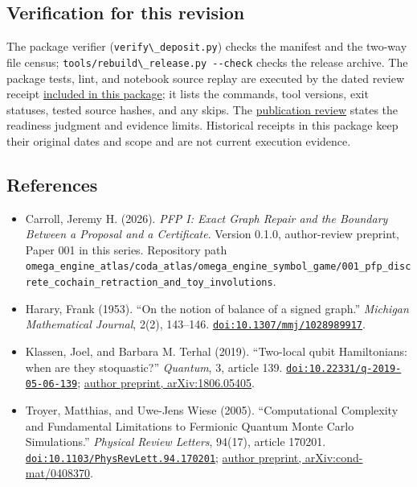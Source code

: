 \documentclass[
  11pt,
]{article}
\newcommand{\passthrough}[1]{#1}
\providecommand{\tightlist}{%
  \setlength{\itemsep}{0pt}\setlength{\parskip}{0pt}}
\begin{document}
\hypertarget{verification-for-this-revision}{%
\subsection{Verification for this
revision}\label{verification-for-this-revision}}

The package verifier (\passthrough{\lstinline!verify\_deposit.py!})
checks the manifest and the two-way file census;
\passthrough{\lstinline!tools/rebuild\_release.py --check!} checks the
release archive. The package tests, lint, and notebook source replay are
executed by the dated review receipt
\href{https://github.com/dbccpage/the_symbol_game/blob/main/omega_engine_education/documentation/030_pfp_proposal_fidelity_protocol_pfp/papers/omega_engine_symbol_game/002_pfp_signed_presentations_and_search_frontier/docs/preprint_review_validation_2026_10_02.json}{included
in this package}; it lists the commands, tool versions, exit statuses,
tested source hashes, and any skips. The
\href{https://github.com/dbccpage/the_symbol_game/blob/main/omega_engine_education/documentation/030_pfp_proposal_fidelity_protocol_pfp/papers/omega_engine_symbol_game/002_pfp_signed_presentations_and_search_frontier/docs/preprint_review_2026_10_02.md}{publication
review} states the readiness judgment and evidence limits. Historical
receipts in this package keep their original dates and scope and are not
current execution evidence.

\hypertarget{references}{%
\subsection{References}\label{references}}

\begin{itemize}
\tightlist
\item
  Carroll, Jeremy H. (2026). \emph{PFP I: Exact Graph Repair and the
  Boundary Between a Proposal and a Certificate}. Version 0.1.0,
  author-review preprint, Paper 001 in this series. Repository path
  \nolinkurl{omega_engine_atlas/coda_atlas/omega_engine_symbol_game/001_pfp_discrete_cochain_retraction_and_toy_involutions}.
\item
  Harary, Frank (1953). ``On the notion of balance of a signed graph.''
  \emph{Michigan Mathematical Journal}, 2(2), 143--146.
  \href{https://doi.org/10.1307/mmj/1028989917}{\nolinkurl{doi:10.1307/mmj/1028989917}}.
\item
  Klassen, Joel, and Barbara M. Terhal (2019). ``Two-local qubit
  Hamiltonians: when are they stoquastic?'' \emph{Quantum}, 3, article
  139.
  \href{https://doi.org/10.22331/q-2019-05-06-139}{\nolinkurl{doi:10.22331/q-2019-05-06-139}};
  \href{https://arxiv.org/abs/1806.05405}{author preprint,
  arXiv:1806.05405}.
\item
  Troyer, Matthias, and Uwe-Jens Wiese (2005). ``Computational
  Complexity and Fundamental Limitations to Fermionic Quantum Monte
  Carlo Simulations.'' \emph{Physical Review Letters}, 94(17), article
  170201.
  \href{https://doi.org/10.1103/PhysRevLett.94.170201}{\nolinkurl{doi:10.1103/PhysRevLett.94.170201}};
  \href{https://arxiv.org/abs/cond-mat/0408370}{author preprint,
  arXiv:cond-mat/0408370}.
\end{itemize}
\end{document}
